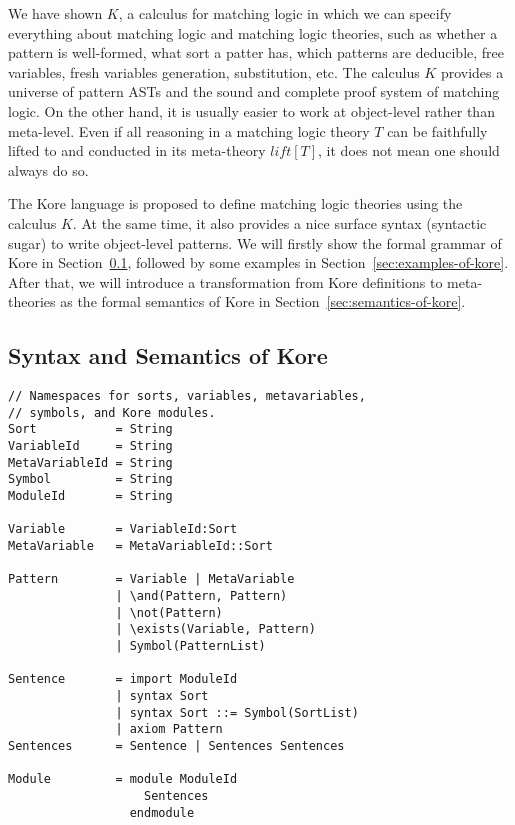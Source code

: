 \documentclass[UTF8]{article}
\theoremstyle{plain}
\theoremstyle{definition}
\theoremstyle{remark}
\begin{document}
We have shown $K$, a calculus for matching logic in which we can specify 
everything about matching logic and matching logic theories, such as 
whether a pattern is well-formed, what sort a patter has, which patterns are 
deducible, free variables, fresh variables generation, substitution, etc.
The calculus $K$ provides a universe of pattern ASTs and the sound and complete 
proof system of matching logic. 
On the other hand, it is usually easier to work at object-level rather than 
meta-level. 
Even if all reasoning in a matching logic theory $T$ can be faithfully lifted 
to and conducted in its meta-theory $\mathit{lift}[T]$, it does not mean one 
should always do so. 

The Kore language is proposed to define matching logic theories using the 
calculus $K$. 
At the same time, it also provides a nice surface syntax 
(syntactic sugar) to write object-level patterns. 
We will firstly show the formal grammar of Kore in 
Section~\ref{sec:syntax-of-kore}, followed by some examples in 
Section~\ref{sec:examples-of-kore}.
After that, we will introduce a transformation from Kore definitions to 
meta-theories as the formal semantics of Kore in 
Section~\ref{sec:semantics-of-kore}.

\subsection{Syntax and Semantics of Kore}
\label{sec:syntax-of-kore}

\begin{Verbatim}[fontsize=\small]
// Namespaces for sorts, variables, metavariables,
// symbols, and Kore modules.
Sort           = String
VariableId     = String
MetaVariableId = String
Symbol         = String
ModuleId       = String

Variable       = VariableId:Sort
MetaVariable   = MetaVariableId::Sort

Pattern        = Variable | MetaVariable
               | \and(Pattern, Pattern)
               | \not(Pattern)
               | \exists(Variable, Pattern)
               | Symbol(PatternList)

Sentence       = import ModuleId
               | syntax Sort
               | syntax Sort ::= Symbol(SortList)
               | axiom Pattern
Sentences      = Sentence | Sentences Sentences

Module         = module ModuleId
                   Sentences
                 endmodule
\end{Verbatim}
\end{document}
